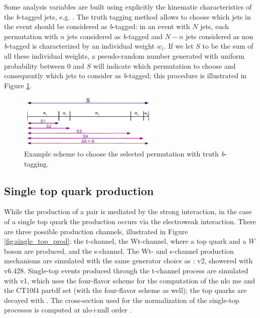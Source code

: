 Some analysis variables are built using explicitly the kinematic characteristics of the \textit{b}-tagged jets, e.g. \mtb. The truth tagging method allows to choose which jets in the event should be considered as \textit{b}-tagged: in an event with $N$ jets, each permutation with $n$ jets considered as \textit{b}-tagged and $N-n$ jets considered as non \textit{b}-tagged is characterized by an individual weight $w_i$. If we let $S$ to be the sum of all these individual weights, a pseudo-random number generated with uniform probability between 0 and $S$ will indicate which permutation to choose and consequently which jets to consider as \textit{b}-tagged; this procedure is illustrated in Figure \ref{fig:susy_common_trf_perm}. 

\begin{figure}[h]
\centering 
\includegraphics[width=0.6\textwidth]{figures/Chap7/Rizzi-Fig7-8-1.pdf}
\caption{Example scheme to choose the selected permutation with truth \textit{b}-tagging.}\label{fig:susy_common_trf_perm}
\end{figure}


\subsection{Single top quark production}

While the production of a \ttbar pair is mediated by the strong interaction, in the case of a single top quark the production occurs via the electroweak interaction. 
There are three possible production channels, illustrated in Figure \ref{fig:single_top_prod}: the t-channel, the Wt-channel, where a top quark and a $W$ boson are produced, and the s-channel. 
The Wt- and s-channel production mechanisms are simulated with the same generator choice as \ttbar: \PowhegBox v2, showered with \PY v6.428.
Single-top events produced through the t-channel process are simulated with \PowhegBox v1, which uses the four-flavor scheme for the computation of the \gls{nlo} \gls{me} and the CT10f4 \gls{partdf} set (with the four-flavor scheme as well); 
the top quarks are decayed with \MadSpin \cite{Artoisenet:2012st}.
The cross-section used for the normalization of the single-top processes is computed at \gls{nlo}+\gls{nnll} order 
\cite{Kidonakis:2011wy,Kidonakis:2010ux,Kidonakis:2010tc}.

